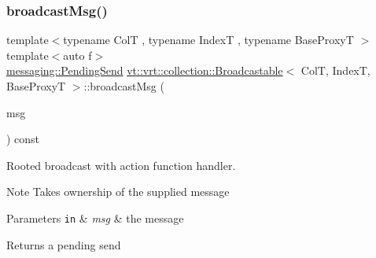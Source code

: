 \subsubsection{\texorpdfstring{broadcast\+Msg()}{broadcastMsg()}\hspace{0.1cm}{\footnotesize\ttfamily [3/3]}}
{\footnotesize\ttfamily template$<$typename ColT , typename IndexT , typename Base\+ProxyT $>$ \\
template$<$auto f$>$ \\
\hyperlink{structvt_1_1messaging_1_1_pending_send}{messaging\+::\+Pending\+Send} \hyperlink{structvt_1_1vrt_1_1collection_1_1_broadcastable}{vt\+::vrt\+::collection\+::\+Broadcastable}$<$ ColT, IndexT, Base\+ProxyT $>$\+::broadcast\+Msg (\begin{DoxyParamCaption}\item[{\hyperlink{structvt_1_1messaging_1_1_msg_ptr_thief}{messaging\+::\+Msg\+Ptr\+Thief}$<$ typename \hyperlink{structvt_1_1_obj_func_traits}{Obj\+Func\+Traits}$<$ decltype(f)$>$\+::MsgT $>$}]{msg }\end{DoxyParamCaption}) const\hspace{0.3cm}{\ttfamily [inline]}}



Rooted broadcast with action function handler. 

\begin{DoxyNote}{Note}
Takes ownership of the supplied message
\end{DoxyNote}

\begin{DoxyParams}[1]{Parameters}
\mbox{\tt in}  & {\em msg} & the message\\
\hline
\end{DoxyParams}
\begin{DoxyReturn}{Returns}
a pending send 
\end{DoxyReturn}
\mbox{\label{structvt_1_1vrt_1_1collection_1_1_broadcastable_a3acc97a928f8d184e54d696e49377008}} 
